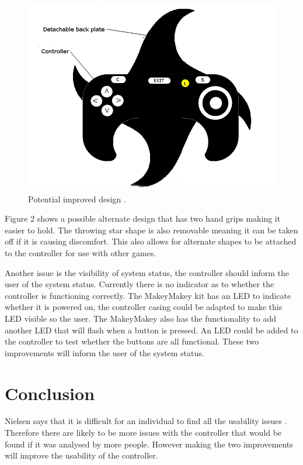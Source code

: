 \documentclass{scrartcl}
\begin{document}
\begin{figure}[h]
	\includegraphics[width=1.0\linewidth]{Improved_design.png}
	\caption{Potential improved design .}
\end{figure}

 Figure 2 shows a possible alternate design that has two hand grips making it easier to hold. The throwing star shape is also removable meaning it can be taken off if it is causing discomfort. This also allows for alternate shapes to be attached to the controller for use with other games. 

Another issue is the visibility of system status, the controller should inform the user of the system status. Currently there is no indicator as to whether the controller is functioning correctly. The MakeyMakey kit has an LED to indicate whether it is powered on, the controller casing could be adapted to make this LED visible so the user. The MakeyMakey also has the functionality to add another LED that will flash when a button is pressed. An LED could be added to the controller to test whether the buttons are all functional. These two improvements will inform the user of the system status. 
\break
\section{Conclusion}
Nielsen says that it is difficult for an individual to find all the usability issues  \cite{HeuristicEvaluation}. Therefore there are likely to be more issues with the controller that would be found if it was analysed by more people. However making the two improvements will improve the usability of the controller.




	
\end{document}
